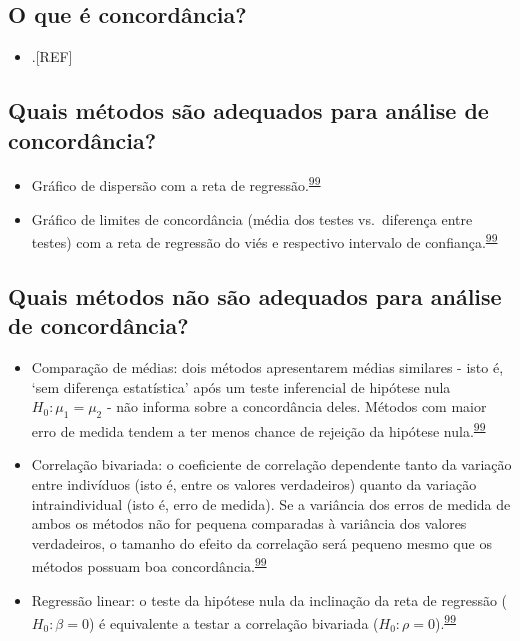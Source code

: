 \documentclass[
]{book}
\providecommand{\tightlist}{%
  \setlength{\itemsep}{0pt}\setlength{\parskip}{0pt}}
\begin{document}
\hypertarget{o-que-uxe9-concorduxe2ncia}{%
\subsection{O que é concordância?}\label{o-que-uxe9-concorduxe2ncia}}

\begin{itemize}
\tightlist
\item
  .{[}REF{]}
\end{itemize}

\hypertarget{quais-muxe9todos-suxe3o-adequados-para-anuxe1lise-de-concorduxe2ncia}{%
\subsection{Quais métodos são adequados para análise de concordância?}\label{quais-muxe9todos-suxe3o-adequados-para-anuxe1lise-de-concorduxe2ncia}}

\begin{itemize}
\item
  Gráfico de dispersão com a reta de regressão.\textsuperscript{\protect\hyperlink{ref-altman1983}{99}}
\item
  Gráfico de limites de concordância (média dos testes vs.~diferença entre testes) com a reta de regressão do viés e respectivo intervalo de confiança.\textsuperscript{\protect\hyperlink{ref-altman1983}{99}}
\end{itemize}

\hypertarget{quais-muxe9todos-nuxe3o-suxe3o-adequados-para-anuxe1lise-de-concorduxe2ncia}{%
\subsection{Quais métodos não são adequados para análise de concordância?}\label{quais-muxe9todos-nuxe3o-suxe3o-adequados-para-anuxe1lise-de-concorduxe2ncia}}

\begin{itemize}
\item
  Comparação de médias: dois métodos apresentarem médias similares - isto é, `sem diferença estatística' após um teste inferencial de hipótese nula \(H_{0}:\mu_{1} = \mu_{2}\) - não informa sobre a concordância deles. Métodos com maior erro de medida tendem a ter menos chance de rejeição da hipótese nula.\textsuperscript{\protect\hyperlink{ref-altman1983}{99}}
\item
  Correlação bivariada: o coeficiente de correlação dependente tanto da variação entre indivíduos (isto é, entre os valores verdadeiros) quanto da variação intraindividual (isto é, erro de medida). Se a variância dos erros de medida de ambos os métodos não for pequena comparadas à variância dos valores verdadeiros, o tamanho do efeito da correlação será pequeno mesmo que os métodos possuam boa concordância.\textsuperscript{\protect\hyperlink{ref-altman1983}{99}}
\item
  Regressão linear: o teste da hipótese nula da inclinação da reta de regressão (\(H_{0}:\beta = 0\)) é equivalente a testar a correlação bivariada (\(H_{0}:\rho = 0\)).\textsuperscript{\protect\hyperlink{ref-altman1983}{99}}
\end{itemize}
\end{document}
